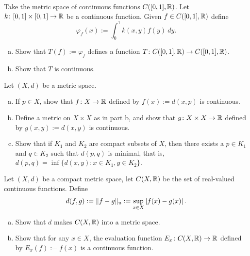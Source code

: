 \begin{exercise}
Take the metric space of continuous functions $C([0,1],{\mathbb{R}})$.  Let
$k \colon [0,1] \times [0,1] \to {\mathbb{R}}$ be a continuous function.
Given $f \in C([0,1],{\mathbb{R}})$ define
\begin{equation*}
\varphi_f(x) := \int_0^1 k(x,y) f(y) ~dy .
\end{equation*}
\begin{enumerate}[a)]
\item
Show that $T(f) := \varphi_f$ defines a function $T \colon C([0,1],{\mathbb{R}}) \to
C([0,1],{\mathbb{R}})$.
\item
Show that $T$ is continuous.
\end{enumerate}
\end{exercise}

\begin{samepage}
\begin{exercise}
Let $(X,d)$ be a metric space.
\begin{enumerate}[a)]
\item
If $p \in X$,
show that $f \colon X \to {\mathbb{R}}$ defined
by $f(x) := d(x,p)$ is continuous.
\item
Define a metric on $X \times X$ as in  part
b, and show that $g \colon X \times X \to {\mathbb{R}}$ defined by
$g(x,y) := d(x,y)$ is continuous.
\item
Show that if $K_1$ and $K_2$ are compact subsets of $X$, then
there exists a $p \in K_1$ and $q \in K_2$ such that $d(p,q)$ is minimal,
that is, $d(p,q) = \inf \{ d(x,y) \colon x \in K_1, y \in K_2 \}$.
\end{enumerate}
\end{exercise}
\end{samepage}

\begin{exercise}
Let $(X,d)$ be a compact metric space, let $C(X,{\mathbb{R}})$ be the set
of real-valued continuous functions.  Define
\begin{equation*}
d(f,g) := \lVert {f-g} \rVert_u := \sup_{x \in X} \left\lvert {f(x)-g(x)} \right\rvert .
\end{equation*}
\begin{enumerate}[a)]
\item
Show that $d$ makes $C(X,{\mathbb{R}})$ into a metric space.
\item
Show that for any $x \in X$, the evaluation function
$E_x \colon C(X,{\mathbb{R}}) \to {\mathbb{R}}$ defined by $E_x(f) := f(x)$
is a continuous function.
\end{enumerate}
\end{exercise}

